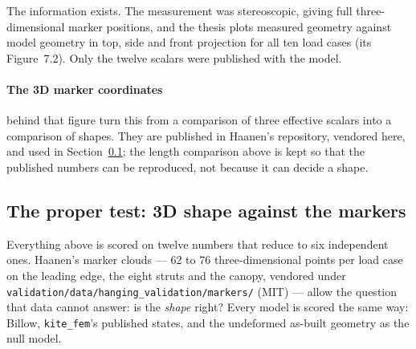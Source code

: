 \documentclass[11pt,a4paper]{article}
\newcommand{\code}[1]{\texttt{\small #1}}
\begin{document}
The information exists. The measurement was stereoscopic, giving full
three-dimensional marker positions, and the thesis plots measured geometry
against model geometry in top, side and front projection for all ten load cases
(its Figure~7.2). Only the twelve scalars were published with the model.

\paragraph{The 3D marker coordinates} behind that figure turn this from a
comparison of three effective scalars into a comparison of shapes. They are
published in Haanen's repository, vendored here, and used in
Section~\ref{sec:hang-shape}; the length comparison above is kept so that the
published numbers can be reproduced, not because it can decide a shape.

\subsection{The proper test: 3D shape against the markers}
\label{sec:hang-shape}

Everything above is scored on twelve numbers that reduce to six independent
ones. Haanen's marker clouds --- 62 to 76 three-dimensional points per load case
on the leading edge, the eight struts and the canopy, vendored under
\code{validation/data/hanging\_validation/markers/} (MIT) --- allow the question
that data cannot answer: is the \emph{shape} right? Every model is scored the
same way: Billow, \texttt{kite\_fem}'s published states, and the undeformed
as-built geometry as the null model.
\end{document}
